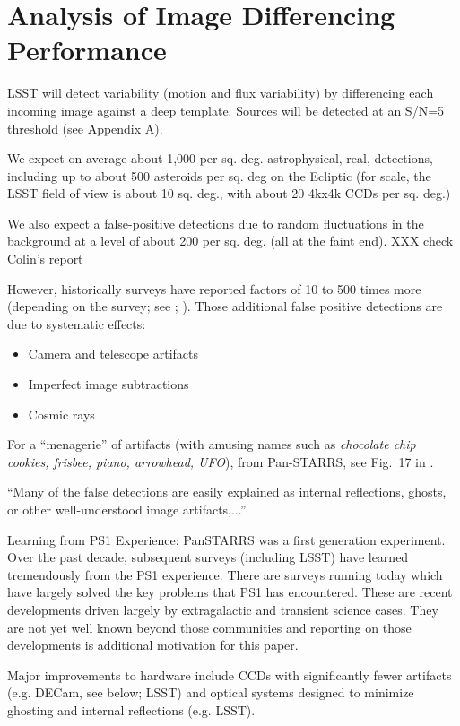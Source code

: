 \section{Analysis of Image Differencing Performance}


LSST will detect variability (motion and flux variability) by
differencing each incoming image against a deep template.
Sources will be detected at an S/N=5 threshold (see Appendix A). 

We expect on average about 1,000 per sq. deg. astrophysical, real,
detections, including up to about 500 asteroids per sq. deg on the 
Ecliptic (for scale, the LSST field of view is about 10 sq. deg., with 
about 20 4kx4k CCDs per sq. deg.)

We also expect a false-positive detections due to random
fluctuations in the background at a level of about 200 per
sq. deg. (all at the faint end).  XXX check Colin's report 

However, historically surveys have reported factors of 10 to 500 times
more (depending on the survey; see \citep{denneau13};
\citep{goldstein15} ). 
Those additional false positive
detections are due to systematic effects: 
\begin{itemize} 
\item Camera and telescope artifacts
\item Imperfect image subtractions
\item Cosmic rays
\end{itemize} 

For a ``menagerie'' of artifacts (with amusing names such as 
{\it chocolate chip cookies, frisbee, piano, arrowhead, UFO}), from
Pan-STARRS, see Fig.~17 in \cite{denneau13}. 

``Many of the false detections are easily explained as internal
reflections, ghosts, or other well-understood image artifacts,...''

Learning from PS1 Experience: PanSTARRS was a first generation
experiment. Over the past decade, subsequent surveys (including LSST) 
have learned tremendously from the PS1 experience. There are surveys 
running today which have largely solved the key problems that PS1 has encountered.
These are recent developments driven largely by extragalactic and
transient science cases. They are not yet well known beyond those
communities and reporting on those developments is additional
motivation for this paper. 
 
Major improvements to hardware include CCDs with significantly fewer 
artifacts (e.g. DECam, see below; LSST) and optical systems designed to
minimize ghosting and internal reflections (e.g. LSST). 

